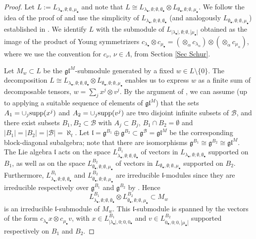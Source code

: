 \documentclass[12pt]{article}
\def\B  {\mathcal B}
\def\mc {\mathcal}
\def\mk {\mathfrak}
\begin{document}
\begin{proof}
Let $L:=L_{\lambda_\bullet,\emptyset;\emptyset,\mu_\bullet}$ and note that $L\cong L_{\lambda_\bullet,\emptyset;\emptyset,\emptyset_\bullet}\otimes L_{\emptyset_\bullet,\emptyset;\emptyset,\mu_\bullet}$. We follow the idea of the proof of \cite[Prop.~4.1]{Chirvasitu-Penkov-OTC} and use the simplicity of $L_{\lambda_\bullet,\emptyset;\emptyset,\emptyset_\bullet}$ (and analogously $L_{\emptyset_\bullet,\emptyset;\emptyset,\mu_\bullet}$) established in \cite[Prop.~4.2]{Chirvasitu-Penkov-RC}. We identify $L$ with the submodule of $L_{|\lambda_\bullet|,\emptyset;\emptyset,|\mu_\bullet|}$ obtained as the image of the product of Young symmetrizers $c_{\lambda_\bullet}\otimes c_{\mu_\bullet}=(\otimes_{\alpha} c_{\lambda_\alpha})\otimes (\otimes_\alpha c_{\mu_\alpha})$, where we use the convention for $c_{\nu}$, $\nu\in\Lambda$, from Section \ref{Sec Schur}.

Let $M_w\subset L$ be the $\mk{gl}^M$-submodule generated by a fixed $w\in L\setminus\{0\}$. The decomposition $L\cong L_{\lambda_\bullet,\emptyset;\emptyset,\emptyset_\bullet}\otimes L_{\emptyset_\bullet,\emptyset;\emptyset,\mu_\bullet}$ enables us to express $w$ as a finite sum of decomposable tensors, $w=\sum_j x^j\otimes v^j$. By the argument of \cite[Prop.~1]{Chirvasitu-3Mackey}, we can assume (up to applying a suitable sequence of elements of $\mk{gl}^M$) that the sets $A_1=\cup_j{\rm supp}(x^j)$ and $A_2=\cup_j{\rm supp}(v^j)$ are two disjoint infinite subsets of $\mc B$, and there exist subsets $B_1,B_2\subset\B$ with $A_j\subset B_j$, $B_1\cap B_2=\emptyset$ and $|B_1|=|B_2|=|\B|=\aleph_t$. Let $\mk l=\mk g^{B_1}\oplus\mk g^{B_2}\subset \mk g^\B=\mk{gl}^M$ be the corresponding block-diagonal subalgebra; note that there are isomorphisms $\mk g^{B_1}\cong \mk g^{B_2}\cong \mk{gl}^M$. The Lie algebra $\mk l$ acts on the space $L^{B_1}_{\lambda_\bullet,\emptyset;\emptyset,\emptyset_\bullet}$ of vectors in $L_{\lambda_\bullet,\emptyset;\emptyset,\emptyset_\bullet}$ supported on $B_1$, as well as on the space $L^{B_2}_{\emptyset_\bullet,\emptyset;\emptyset,\mu_\bullet}$ of vectors in $L_{\emptyset_\bullet,\emptyset;\emptyset,\mu_\bullet}$ supported on $B_2$. Furthermore, $L^{B_1}_{\lambda_\bullet,\emptyset;\emptyset,\emptyset_\bullet}$ and $L^{B_2}_{\emptyset_\bullet,\emptyset;\emptyset,\mu_\bullet}$ are irreducible $\mk l$-modules since they are irreducible respectively over $\mk g^{B_1}$ and $\mk g^{B_2}$ by \cite[Prop.~4.2]{Chirvasitu-Penkov-RC}. Hence 
$$
L^{B_1}_{\lambda_\bullet,\emptyset;\emptyset,\emptyset_\bullet} \otimes L^{B_2}_{\emptyset_\bullet,\emptyset;\emptyset,\mu_\bullet} \subset M_w
$$
is an irreducible $\mk l$-submodule of $M_w$. This $\mk l$-submodule is spanned by the vectors of the form $c_{\lambda_\bullet} x \otimes c_{\mu_\bullet} v$, with $x\in L^{B_1}_{|\lambda_\bullet|,0;0,0_\bullet}$ and $v\in L^{B_2}_{0_\bullet,0;0,|\mu_\bullet|}$ supported respectively on $B_1$ and $B_2$.


\end{proof}
\end{document}

